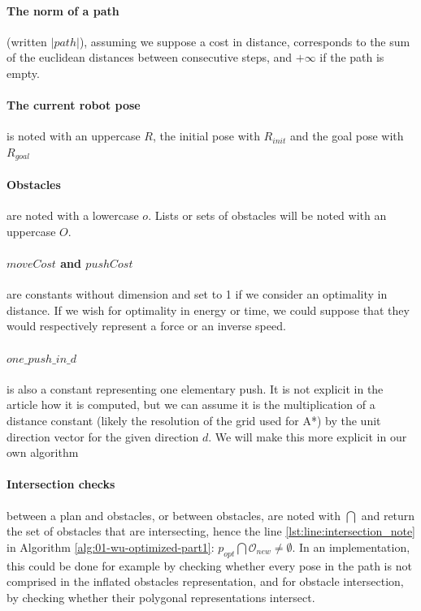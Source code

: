 \paragraph{The norm of a path} (written $|path|$), assuming we suppose a cost in distance,  corresponds to the sum of the euclidean distances between consecutive steps, and $+\infty$ if the path is empty.

\paragraph{The current robot pose} is noted with an uppercase $R$, the initial pose with $R_{init}$ and the goal pose with $R_{goal}$

\paragraph{Obstacles} are noted with a lowercase $o$. Lists or sets of obstacles will be noted with an uppercase $O$.



\paragraph{$moveCost$ and $pushCost$} are constants without dimension and set to 1 if we consider an optimality in distance. If we wish for optimality in energy or time, we could suppose that they would respectively represent a force or an inverse speed.

\paragraph{$one\_push\_in\_d$} is also a constant representing one elementary push. It is not explicit in the article how it is computed, but we can assume it is the multiplication of a distance constant (likely the resolution of the grid used for A*) by the unit direction vector for the given direction $d$. We will make this more explicit in our own algorithm

\paragraph{Intersection checks} between a plan and obstacles, or between obstacles, are noted with $\bigcap$ and return the set of obstacles that are intersecting, hence the line \ref{lst:line:intersection_note} in Algorithm \ref{alg:01-wu-optimized-part1}: $p_{opt} \bigcap \mathcal{O}_{new} \neq \emptyset$. In an implementation, this could be done for example by checking whether every pose in the path is not comprised in the inflated obstacles representation, and for obstacle intersection, by checking whether their polygonal representations intersect.

